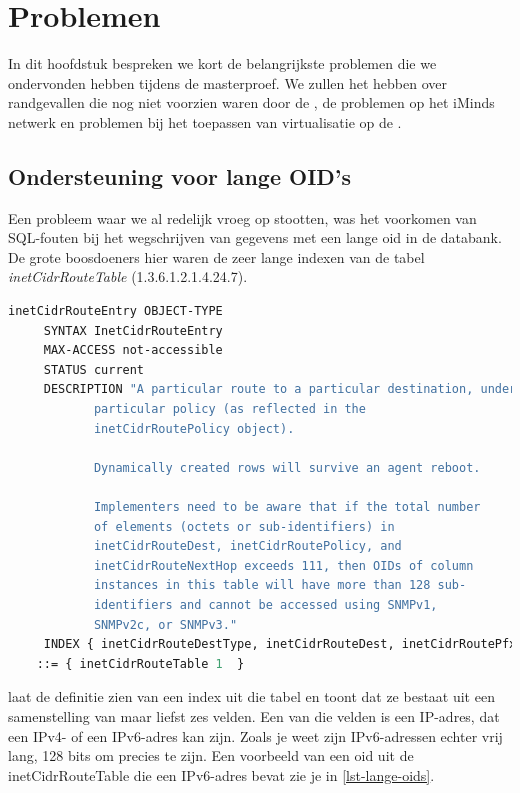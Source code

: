 \chapter{Problemen}

In dit hoofdstuk bespreken we kort de belangrijkste problemen die we ondervonden hebben tijdens de masterproef.
We zullen het hebben over randgevallen die nog niet voorzien waren door de \nwmretriever{},
de problemen op het iMinds netwerk en problemen bij het toepassen van virtualisatie op de \vwall{}.


\section{Ondersteuning voor lange OID's}
\label{probleem-lange-oids}

Een probleem waar we al redelijk vroeg op stootten, was het voorkomen van SQL-fouten bij het wegschrijven van gegevens met een lange \gls{oid} in de databank.
De grote boosdoeners hier waren de zeer lange indexen van de tabel \textit{inetCidrRouteTable} (1.3.6.1.2.1.4.24.7).

\begin{lstlisting}[language=asn.1, float=h, caption={Definitie van een inetCidrRouteEntry}, label=lst-inetCidrRouteEntry]
inetCidrRouteEntry OBJECT-TYPE 
	 SYNTAX InetCidrRouteEntry
	 MAX-ACCESS not-accessible
	 STATUS current
	 DESCRIPTION "A particular route to a particular destination, under a 
            particular policy (as reflected in the 
            inetCidrRoutePolicy object). 
 
            Dynamically created rows will survive an agent reboot. 
 
            Implementers need to be aware that if the total number 
            of elements (octets or sub-identifiers) in 
            inetCidrRouteDest, inetCidrRoutePolicy, and 
            inetCidrRouteNextHop exceeds 111, then OIDs of column 
            instances in this table will have more than 128 sub- 
            identifiers and cannot be accessed using SNMPv1, 
            SNMPv2c, or SNMPv3."
	 INDEX { inetCidrRouteDestType, inetCidrRouteDest, inetCidrRoutePfxLen, inetCidrRoutePolicy, inetCidrRouteNextHopType, inetCidrRouteNextHop } 
 	::= { inetCidrRouteTable 1  }
\end{lstlisting}

 laat de definitie zien van een index uit die tabel en toont dat ze bestaat uit een samenstelling van maar liefst zes velden.
Een van die velden is een IP-adres, dat een IPv4- of een IPv6-adres kan zijn.
Zoals je weet zijn IPv6-adressen echter vrij lang, 128 bits om precies te zijn.
Een voorbeeld van een \gls{oid} uit de inetCidrRouteTable die een IPv6-adres bevat zie je in \cref{lst-lange-oids}.

